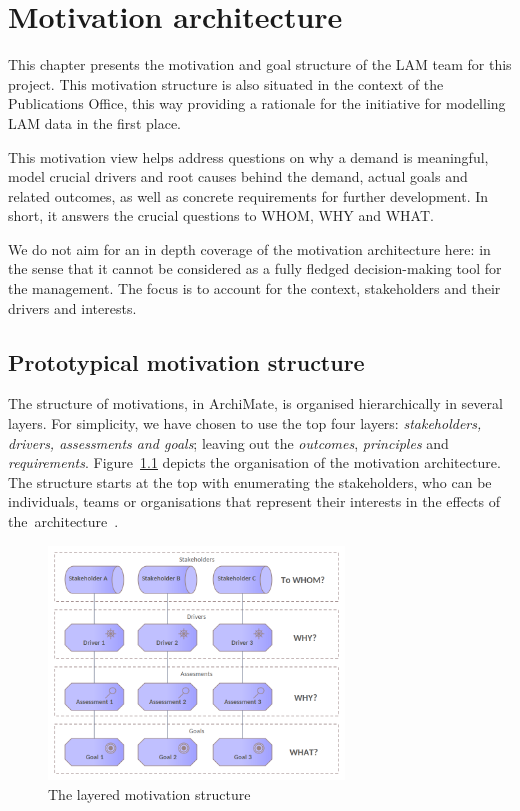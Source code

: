 \chapter{Motivation architecture}
\label{sec:motivation-architecture}

	This chapter presents the motivation and goal structure of the LAM team for this project. This motivation structure is also situated in the context of the Publications Office, this way providing a rationale for the initiative for modelling LAM data in the first place. 
		
	This motivation view helps address questions on why a demand is meaningful, model crucial drivers and root causes behind the demand, actual goals and related outcomes, as well as concrete requirements for further development. In short, it answers the crucial questions to WHOM, WHY and WHAT.
	
	We do not aim for an in depth coverage of the motivation architecture here: in the sense that it cannot be considered as a fully fledged decision-making tool for the management. The focus is to account for the context, stakeholders and their drivers and interests.
	
	\section{Prototypical motivation structure}
	\label{sec:how-to-motivation}		
	
	The structure of motivations, in ArchiMate, is organised hierarchically in several layers. For simplicity, we have chosen to use the top four layers: \textit{stakeholders, drivers, assessments and goals}; leaving out the \textit{outcomes}, \textit{principles} and \textit{requirements}. \mbox{Figure \ref{fig:morivation-structure}} depicts the organisation of the motivation architecture. The structure starts at the top with enumerating the stakeholders, who can be individuals, teams or organisations that represent their interests in the effects of \mbox{the architecture \citep{archimate3.1}}. 
	
	\begin{figure}[h]
		\centering
		\includegraphics[width=0.7\textwidth]{images/views/Motivation view.png}
		\caption{The layered motivation structure}
		\label{fig:morivation-structure}
	\end{figure}
	
